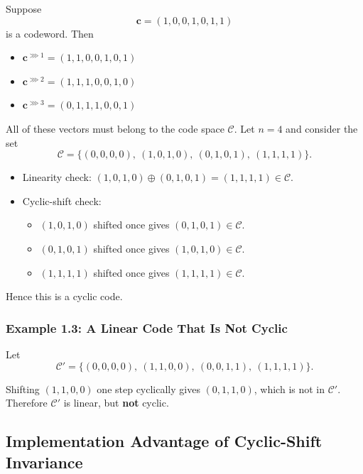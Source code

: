 \begin{example}
Suppose \[
\mathbf{c} = (1,0,0,1,0,1,1)
\] is a codeword. Then
\begin{itemize}
	\item \(\mathbf{c}^{\ggg 1} = (1,1,0,0,1,0,1)\)
	\item \(\mathbf{c}^{\ggg 2} = (1,1,1,0,0,1,0)\)
	\item \(\mathbf{c}^{\ggg 3} = (0,1,1,1,0,0,1)\)
\end{itemize}
All of these vectors must belong to the code space \(\mathcal{C}\). Let \(n=4\) and consider the set
\[\mathcal{C} = \{(0,0,0,0),\ (1,0,1,0),\ (0,1,0,1),\ (1,1,1,1)\}.\]

\end{example}
\begin{itemize}
	\item
	Linearity check:
	\((1,0,1,0) \oplus (0,1,0,1) = (1,1,1,1) \in \mathcal{C}\).
	\item
	Cyclic-shift check:
	
	\begin{itemize}
		\item
		\((1,0,1,0)\) shifted once gives \((0,1,0,1) \in \mathcal{C}\).
		\item
		\((0,1,0,1)\) shifted once gives \((1,0,1,0) \in \mathcal{C}\).
		\item
		\((1,1,1,1)\) shifted once gives \((1,1,1,1) \in \mathcal{C}\).
	\end{itemize}
\end{itemize}

Hence this is a cyclic code.

\subsubsection{Example 1.3: A Linear Code That Is Not
	Cyclic}\label{example-1.3-a-linear-code-that-is-not-cyclic}

Let
\[\mathcal{C}' = \{(0,0,0,0),\ (1,1,0,0),\ (0,0,1,1),\ (1,1,1,1)\}.\]

Shifting \((1,1,0,0)\) one step cyclically gives \((0,1,1,0)\), which is
not in \(\mathcal{C}'\). Therefore \(\mathcal{C}'\) is linear, but
\textbf{not} cyclic.

\newpage

\subsection{Implementation Advantage of Cyclic-Shift Invariance}

